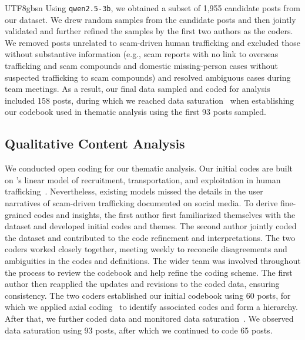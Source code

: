 \documentclass[sigconf,nonacm]{acmart}
\newcommand{\add}[1]{#1}
\begin{document}
\begin{CJK}{UTF8}{gbsn}
Using \texttt{qwen2.5-3b}, we obtained a subset of 1,955 candidate posts from our dataset. \add{We drew random samples from the candidate posts and then jointly validated and further refined the samples by the first two authors as the coders. We removed posts unrelated to scam-driven human trafficking and excluded those without substantive information (e.g., scam reports with no link to overseas trafficking and scam compounds and domestic missing-person cases without suspected trafficking to scam compounds) and resolved ambiguous cases during team meetings.} As a result, our final data sampled and coded for analysis included 158 posts, during which we reached data saturation~\cite{saunders2018saturation} when establishing our codebook used in thematic analysis using the first 93 posts sampled.

\subsection{Qualitative Content Analysis}

We conducted open coding for our thematic analysis. Our initial codes are built on \citeauthor{kleemans2014human}'s linear model of recruitment, transportation,  and exploitation in human trafficking~\cite{kleemans2014human}. Nevertheless, existing models missed the details in the user narratives of scam-driven trafficking documented on social media. \add{To derive fine-grained codes and insights, the first author first familiarized themselves with the dataset and developed initial codes and themes. The second author jointly coded the dataset and contributed to the code refinement and interpretations. The two coders worked closely together, meeting weekly to reconcile disagreements and ambiguities in the codes and definitions. The wider team was involved throughout the process to review the codebook and help refine the coding scheme. The first author then reapplied the updates and revisions to the coded data, ensuring consistency.} The two coders established our initial codebook using 60 posts, for which we applied axial coding~\cite{corbin2008basics} to identify associated codes and form a hierarchy. After that, we further coded data and monitored data saturation~\cite{saunders2018saturation}. We observed data saturation using 93 posts, after which we continued to code 65 posts. 


\end{CJK}
\end{document}
